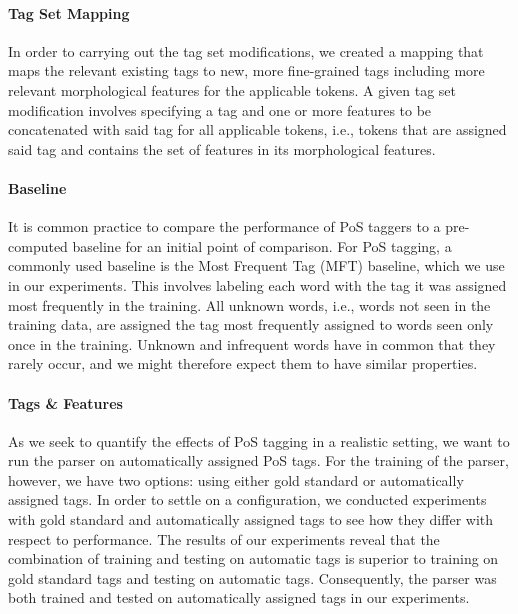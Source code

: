 \documentclass[11pt,a4paper]{article}
\begin{document}
\paragraph{Tag Set Mapping}
In order to carrying out the tag set modifications, we created a mapping that
maps the relevant existing tags to new, more fine-grained tags including more
relevant morphological features for the applicable tokens. A given tag set
modification involves specifying a tag and one or more features to be
concatenated with said tag for all applicable tokens, i.e., tokens that are
assigned said tag and contains the set of features in its morphological
features.

\paragraph{Baseline}
It is common practice to compare the performance of PoS taggers to a
pre-computed baseline for an initial point of comparison.
For PoS tagging, a commonly used baseline is the Most Frequent Tag (MFT)
baseline, which we use in our experiments. This involves labeling each word
with the tag it was assigned most frequently in the training. All unknown
words, i.e., words not seen in the training data, are assigned the tag most
frequently assigned to words seen only once in the training. Unknown and
infrequent words have in common that they rarely occur, and we might therefore
expect them to have similar properties.

\paragraph{Tags \& Features}
As we seek to quantify the effects of PoS tagging in a realistic setting, we
want to run the parser on automatically assigned PoS tags. For the training of
the parser, however, we have two options: using either gold standard or
automatically assigned tags. In order to settle on a configuration, we
conducted experiments with gold standard and automatically assigned tags to see
how they differ with respect to performance. The results of our experiments
reveal that the combination of training and testing on automatic tags is
superior to training on gold standard tags and testing on automatic tags.
Consequently, the parser was both trained and tested on automatically assigned
tags in our experiments.
\end{document}
